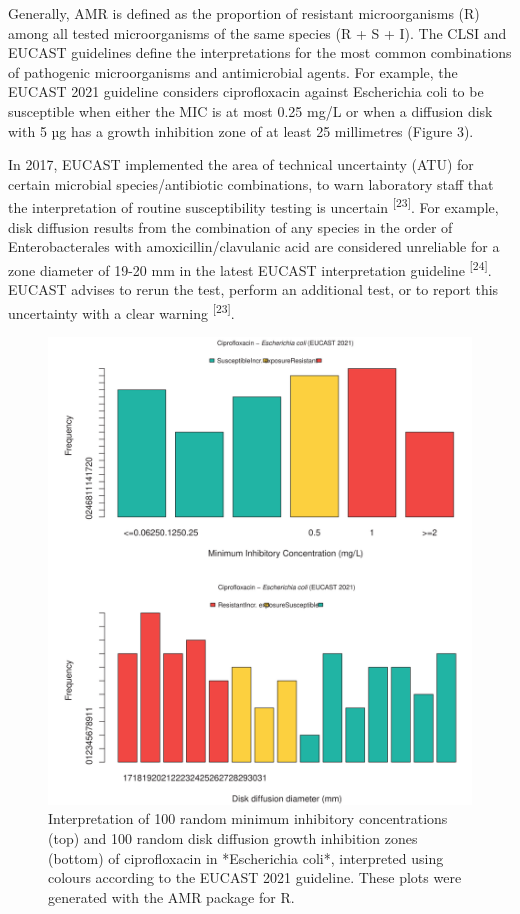 \documentclass[
]{book}
\begin{document}
Generally, AMR is defined as the proportion of resistant microorganisms (R) among all tested microorganisms of the same species (R + S + I). The CLSI and EUCAST guidelines define the interpretations for the most common combinations of pathogenic microorganisms and antimicrobial agents. For example, the EUCAST 2021 guideline considers ciprofloxacin against Escherichia coli to be susceptible when either the MIC is at most 0.25 mg/L or when a diffusion disk with 5 µg has a growth inhibition zone of at least 25 millimetres (Figure 3).

In 2017, EUCAST implemented the area of technical uncertainty (ATU) for certain microbial species/antibiotic combinations, to warn laboratory staff that the interpretation of routine susceptibility testing is uncertain \textsuperscript{{[}23{]}}. For example, disk diffusion results from the combination of any species in the order of Enterobacterales with amoxicillin/clavulanic acid are considered unreliable for a zone diameter of 19-20 mm in the latest EUCAST interpretation guideline \textsuperscript{{[}24{]}}. EUCAST advises to rerun the test, perform an additional test, or to report this uncertainty with a clear warning \textsuperscript{{[}23{]}}.

\begin{figure}

{\centering \includegraphics[width=1\linewidth]{images/01-03} 

}

\caption{Interpretation of 100 random minimum inhibitory concentrations (top) and 100 random disk diffusion growth inhibition zones (bottom) of ciprofloxacin in *Escherichia coli*, interpreted using colours according to the EUCAST 2021 guideline. These plots were generated with the AMR package for R.}\label{fig:intro-3}
\end{figure}
\end{document}
